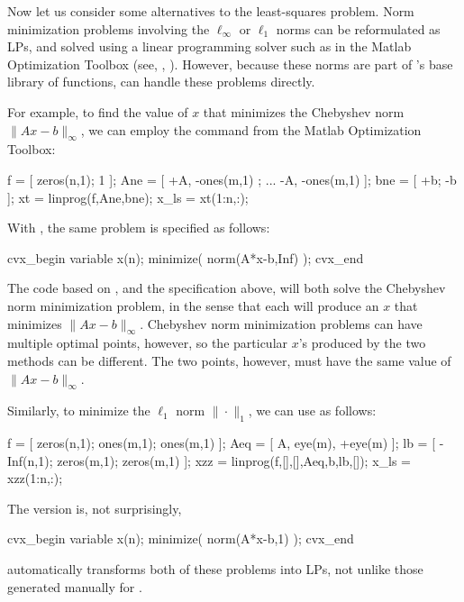 \documentclass[12pt]{article}
\begin{document}
Now let us consider some alternatives to the least-squares problem.
Norm minimization problems involving the $\ell_\infty$ or
$\ell_1$ norms can be reformulated as LPs, and solved using
a linear programming solver such as \verb@linprog@ in the Matlab
Optimization Toolbox (see, \eg, \cite[\S 6.1]{BV:04}). However,
because these norms are part of \cvx's base library of functions,
\cvx can handle these problems directly.

For example, to find the value of $x$ that minimizes
the Chebyshev norm $\|Ax-b\|_\infty$, we can employ the \verb@linprog@
command from the Matlab Optimization Toolbox:
\begin{code2}[firstnumber=97]
	f    = [ zeros(n,1); 1          ];
	Ane  = [ +A,         -ones(m,1)  ; ...
	         -A,         -ones(m,1) ];
	bne  = [ +b;         -b         ];
	xt   = linprog(f,Ane,bne);
	x_ls = xt(1:n,:);
\end{code2}
With \cvx, the same problem is specified as follows:
\begin{code2}[firstnumber=108]
	cvx_begin
	    variable x(n);
	    minimize( norm(A*x-b,Inf) );
	cvx_end
\end{code2}
The code based on
\verb@linprog@, and the \cvx specification above, will both
solve the Chebyshev norm minimization problem, in the sense that
each will produce an $x$ that minimizes $\|Ax-b\|_\infty$.
Chebyshev norm minimization problems can have multiple optimal
points, however, so the particular $x$'s produced by the two
methods can be different.  The two points, however, must 
have the same value of $\|Ax-b\|_\infty$.

Similarly, to minimize the $\ell_1$ norm $\|\cdot\|_1$, we can
use \verb@linprog@ as follows:
\begin{code2}[firstnumber=139]
	f    = [ zeros(n,1); ones(m,1);  ones(m,1)  ];
	Aeq  = [ A,          eye(m),     +eye(m)    ];
	lb   = [ -Inf(n,1);  zeros(m,1); zeros(m,1) ];
	xzz  = linprog(f,[],[],Aeq,b,lb,[]);
	x_ls = xzz(1:n,:);
\end{code2}
The \cvx version is, not surprisingly,
\begin{code2}[firstnumber=149]
	cvx_begin
	    variable x(n);
	    minimize( norm(A*x-b,1) );
	cvx_end
\end{code2}
\cvx automatically transforms both of these problems into LPs, not unlike
those generated manually for \verb@linprog@.
\end{document}
